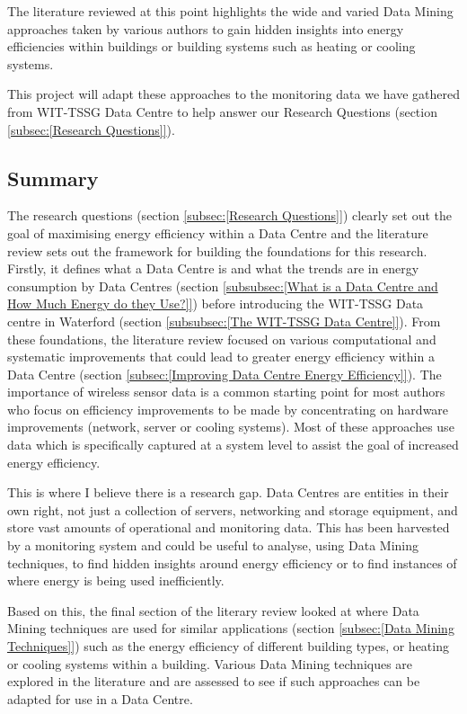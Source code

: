 \documentclass[12pt]{scrartcl}
\begin{document}
The literature reviewed at this point highlights the wide and varied Data Mining approaches taken by various authors to gain hidden insights into energy efficiencies within buildings or building systems such as heating or cooling systems. 

This project will adapt these approaches to the monitoring data we have gathered from WIT-TSSG Data Centre to help answer our Research Questions (section \ref{subsec:[Research Questions]}).   

\subsection{Summary}  
\label{subsec:[Summary]}
The research questions (section \ref{subsec:[Research Questions]}) clearly set out the goal of maximising energy efficiency within a Data Centre and the literature review sets out the framework for building the foundations for this research. Firstly, it defines what a Data Centre is and what the trends are in energy consumption by Data Centres (section \ref{subsubsec:[What is a Data Centre and How Much Energy do they Use?]}) before introducing the WIT-TSSG Data centre in Waterford (section \ref{subsubsec:[The WIT-TSSG Data Centre]}). From these foundations, the literature review focused on various computational and systematic improvements that could lead to greater energy efficiency within a Data Centre (section \ref{subsec:[Improving Data Centre Energy Efficiency]}). The importance of wireless sensor data is a common starting point for most authors who focus on efficiency improvements to be made by concentrating on hardware improvements (network, server or cooling systems). Most of these approaches use data which is specifically captured at a system level to assist the goal of increased energy efficiency.

This is where I believe there is a research gap. Data Centres are entities in their own right, not just a collection of servers, networking and storage equipment, and store vast amounts of operational and monitoring data. This has been harvested by a monitoring system and could be useful to analyse, using Data Mining techniques, to find hidden insights around energy efficiency or to find instances of where energy is being used inefficiently. 

Based on this, the final section of the literary review looked at where Data Mining techniques are used for similar applications (section \ref{subsec:[Data Mining Techniques]}) such as the energy efficiency of different building types, or heating or cooling systems within a building. Various Data Mining techniques are explored in the literature and are assessed to see if such approaches can be adapted for use in a Data Centre.   
\end{document}
